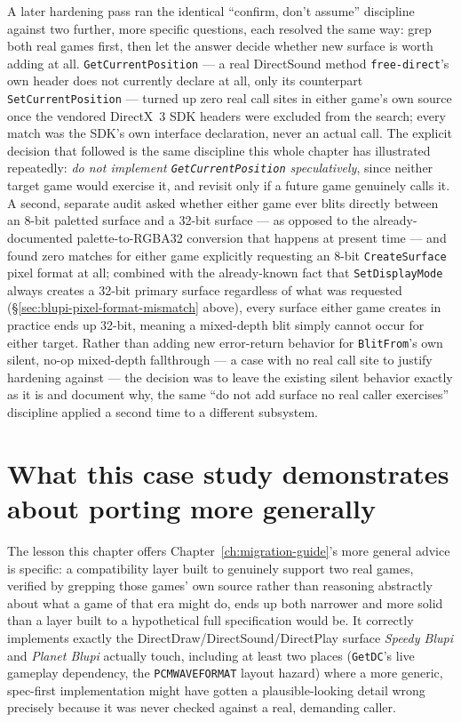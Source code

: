A later hardening pass ran the identical ``confirm, don't assume'' discipline against two
further, more specific questions, each resolved the same way: grep both real games first, then
let the answer decide whether new surface is worth adding at all. \texttt{GetCurrentPosition}
--- a real DirectSound method \texttt{free-direct}'s own header does not currently
declare at all, only its counterpart \texttt{SetCurrentPosition} --- turned up zero real call
sites in either game's own source once the vendored DirectX~3 SDK headers were excluded from the
search; every match was the SDK's own interface declaration, never an actual call. The explicit
decision that followed is the same discipline this whole chapter has illustrated repeatedly:
\emph{do not implement \texttt{GetCurrentPosition} speculatively}, since neither target game
would exercise it, and revisit only if a future game genuinely calls it. A second, separate
audit asked whether either
game ever blits directly between an 8-bit paletted surface and a 32-bit surface --- as opposed
to the already-documented palette-to-RGBA32 conversion that happens at present time --- and
found zero matches for either game explicitly requesting an 8-bit \texttt{CreateSurface} pixel
format at all; combined with the already-known fact that \texttt{SetDisplayMode} always creates
a 32-bit primary surface regardless of what was requested
(\S\ref{sec:blupi-pixel-format-mismatch} above), every surface either game creates in practice
ends up 32-bit, meaning a mixed-depth blit simply cannot occur for either target. Rather than adding new error-return behavior for \texttt{BlitFrom}'s own silent,
no-op mixed-depth fallthrough --- a case with no real call site to justify hardening against ---
the decision was to leave the existing silent behavior exactly as it is and document why, the
same ``do not add surface no real caller exercises'' discipline applied a second time to a
different subsystem.

\section{What this case study demonstrates about porting more generally}

The lesson this chapter offers Chapter~\ref{ch:migration-guide}'s more general advice is
specific: a compatibility layer built to genuinely support two real games, verified by
grepping those games' own source rather than reasoning abstractly about what a game of that
era might do, ends up both narrower and more solid than a layer built to a hypothetical full
specification would be. It correctly implements exactly the DirectDraw/DirectSound/DirectPlay
surface \emph{Speedy Blupi} and \emph{Planet Blupi} actually touch, including at least two
places (\texttt{GetDC}'s live gameplay dependency, the \texttt{PCMWAVEFORMAT} layout hazard)
where a more generic, spec-first implementation might have gotten a plausible-looking detail
wrong precisely because it was never checked against a real, demanding caller.
